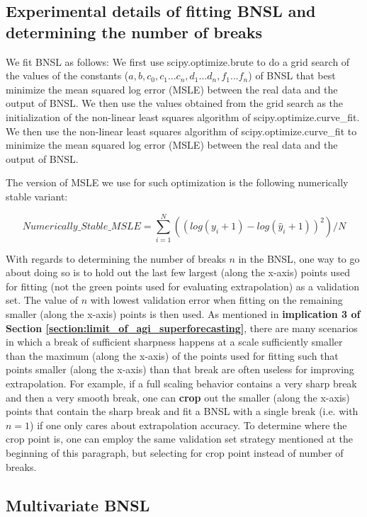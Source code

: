 \documentclass{article} %
\begin{document}
\subsection{Experimental details of fitting BNSL and determining the number of breaks}
\label{section:BNSL_fit_details}
We fit BNSL as follows:
We first use scipy.optimize.brute to do a grid search of the values of the constants ($a, b, c_0, c_1 ... c_n, d_1 ...  d_n, f_1 ... f_n$) of BNSL that best minimize the mean squared log error (MSLE) between the real data and the output of BNSL.
We then use the values obtained from the grid search as the initialization of the non-linear least squares algorithm of scipy.optimize.curve\_fit.
We then use the non-linear least squares algorithm of scipy.optimize.curve\_fit to minimize the mean squared log error (MSLE) between the real data and the output of BNSL.

The version of MSLE we use for such optimization is the following numerically stable variant:

\[Numerically\_Stable\_MSLE = \sum_{i=1}^{N} ((log(y_{i}+1)-log(\hat{y}_{i}+1))^2)/N\] 

With regards to determining the number of breaks $n$ in the BNSL, one way to go about doing so is to hold out the last few largest (along the x-axis) points used for fitting (not the green points used for evaluating extrapolation) as a validation set. The value of $n$ with lowest validation error when fitting on the remaining smaller (along the x-axis) points is then used. As mentioned in \textbf{implication 3 of Section \ref{section:limit_of_agi_superforecasting}}, there are many scenarios in which a break of sufficient sharpness happens at a scale sufficiently smaller than the maximum (along the x-axis) of the points used for fitting such that points smaller (along the x-axis) than that break are often useless for improving extrapolation. For example, if a full scaling behavior contains a very sharp break and then a very smooth break, one can \textbf{crop} out the smaller (along the x-axis) points that contain the sharp break and fit a BNSL with a single break (i.e. with $n=1$) if one only cares about extrapolation accuracy. To determine where the crop point is, one can employ the same validation set strategy mentioned at the beginning of this paragraph, but selecting for crop point instead of number of breaks.

\iffalse

\subsection{Multivariate BNSL}
\label{section:BNSL_multivariate}
\end{document}
